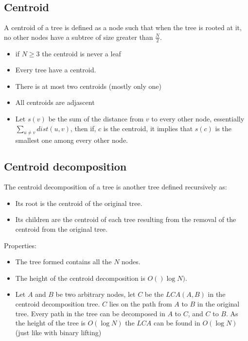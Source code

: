 \subsection{Centroid}

A  centroid of a tree is defined as a node such that when the tree is rooted at it, no other nodes have a subtree of size greater than $\frac{N}{2}$.

\begin{itemize}
  \item if $N \geq 3$ the centroid is never a leaf
  \item Every tree have a centroid.
  \item There is at most two centroids (mostly only one)
  \item All centroids are adjascent
  \item Let $s(v)$ be the sum of the distance from $v$ to every other node, essentially $\sum_{u \neq v} dist(u,v)$, then if, $c$ is the centroid, it implies that $s(c)$ is the smallest one among every other node.
\end{itemize}

\subsection{Centroid decomposition}

The centroid decomposition of a tree is another tree defined recursively as:

\begin{itemize}
  \item Its root is the centroid of the original tree.
  \item Its children are the centroid of each tree resulting from the removal of the centroid from the original tree.
\end{itemize}

Properties:

\begin{itemize}
  \item The tree formed contains all the $N$ nodes.
  \item The height of the centroid decomposition is $O()\log{N})$.
  \item Let $A$ and $B$ be two arbitrary nodes, let $C$ be the $LCA(A,B)$ in the centroid decomposition tree.
    \subitem $C$ lies on the path from $A$ to $B$ in the original tree.
    \subitem Every path in the tree can be decomposed in $A$ to $C$, and $C$ to $B$.
    \subitem As the height of the tree is $O(\log{N})$ the $LCA$ can be found in $O(\log{N})$ (just like with binary lifting)
\end{itemize}


